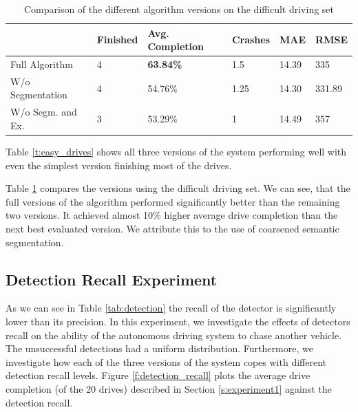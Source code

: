 \documentclass{ctuthesis/ctuthesis}
\begin{document}
\begin{table}[]
\tabcolsep=0.11cm
\begin{tabular}{l|lllll}
\hline
                                       & Finished & Avg. Completion & Crashes & MAE   & RMSE   \\ \hline
Full Algorithm                         & 4               & \textbf{63.84\%}         & 1.5     & 14.39 & 335    \\
W/o Segmentation                   & 4               & 54.76\%                  & 1.25    & 14.30 & 331.89 \\
W/o Segm. and Ex. & 3               & 53.29\%                  & 1       & 14.49 & 357    \\ \hline
\end{tabular}
\caption{Comparison of the different algorithm versions on the difficult driving set}\label{t:difficult_drives}
\end{table}

Table \ref{t:easy_drives} shows all three versions of the system performing well with even the simplest version finishing most of the drives. \par
Table \ref{t:difficult_drives} compares the versions using the difficult driving set. We can see, that the full versions of the algorithm performed significantly better than the remaining two versions. It achieved almost 10\% higher average drive completion than the next best evaluated version. We attribute this to the use of coarsened semantic segmentation. \par






\subsection{Detection Recall Experiment}
As we can see in Table \ref{tab:detection} the recall of the detector is significantly lower than its precision. In this experiment, we investigate the effects of detectors recall on the ability of the autonomous driving system to chase another vehicle. The unsuccessful detections had a uniform distribution. Furthermore, we investigate how each of the three versions of the system copes with different detection recall levels. Figure \ref{f:detection_recall} plots the average drive completion (of the 20 drives) described in Section \ref{s:experiment1} against the detection recall. \par
\end{document}
